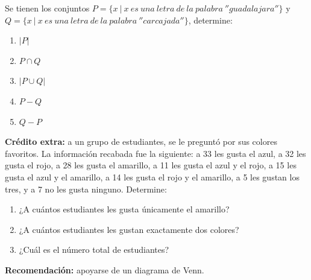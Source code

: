 \documentclass[12pt]{article}
\begin{document}
\begin{problema}
    Se tienen los conjuntos $P=\{ x \ | \ x \ es \ una \ letra \ de \ la \ palabra \ ''guadalajara''\}$ y $Q=\{ x \ | \ x \ es \ una \ letra \ de \ la \ palabra \ ''carcajada''\}$, determine:

    \renewcommand{\labelenumi}{\alph{enumi})}
    \begin{multicols}{2}
    \begin{enumerate}
        \item $|P|$
        \item $P \cap Q$
        \item $|P \cup Q|$
        \item $P-Q$
        \item $Q-P$
    \end{enumerate}
    \end{multicols}
\end{problema}

\textbf{Crédito extra:} a un grupo de estudiantes, se le preguntó por sus colores favoritos. La información recabada fue la siguiente: a 33 les gusta el azul, a 32 les gusta el rojo, a 28 les gusta el amarillo, a 11 les gusta el azul y el rojo, a 15 les gusta el azul y el amarillo, a 14 les gusta el rojo y el amarillo, a 5 les gustan los tres, y a 7 no les gusta ninguno. Determine:

    \renewcommand{\labelenumi}{\alph{enumi})}
    \begin{enumerate}
        \item ¿A cuántos estudiantes les gusta únicamente el amarillo?
        \item ¿A cuántos estudiantes les gustan exactamente dos colores?
        \item ¿Cuál es el número total de estudiantes?
    \end{enumerate}

\textbf{Recomendación:} apoyarse de un diagrama de Venn.
\end{document}
